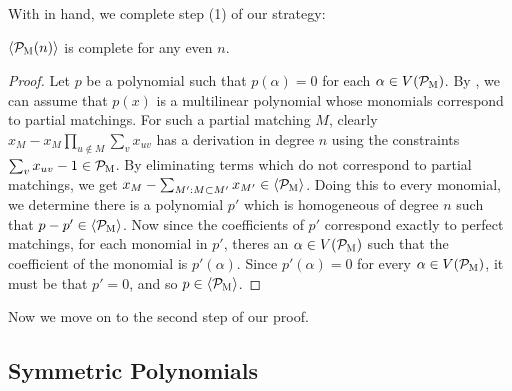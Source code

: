 With  in hand, we complete step (1) of our strategy:
\begin{lemma}\label{lem:matching-complete}
$\langle \mathcal P_{\textsc{M}}(n) \rangle$ is complete for any even $n$. 
\end{lemma}
\begin{proof}
Let $p$ be a polynomial such that $p(\alpha) = 0$ for each $\alpha \in V(\mathcal P_{\textsc{M}})$. By , we can assume that $p(x)$ is a multilinear polynomial whose monomials correspond to partial matchings. For such a partial matching $M$, clearly $x_M - x_M\prod_{u \notin M} \sum_v x_{uv}$ has a derivation in degree $n$ using the constraints $\sum_v x_{uv} - 1 \in \mathcal P_{\textsc{M}}$. By eliminating terms which do not correspond to partial matchings, we get $x_M - \sum_{M': M \subset M'} x_{M'} \in \langle \mathcal P_{\textsc{M}} \rangle$. Doing this to every monomial, we determine there is a polynomial $p'$ which is homogeneous of degree $n$ such that $p - p' \in \langle \mathcal P_{\textsc{M}} \rangle$. Now since the coefficients of $p'$ correspond exactly to perfect matchings, for each monomial in $p'$, theres an $\alpha \in V(\mathcal P_{\textsc{M}})$ such that the coefficient of the monomial is $p'(\alpha)$. Since $p'(\alpha) = 0$ for every $\alpha \in V(\mathcal P_{\textsc{M}})$, it must be that $p' = 0$, and so $p \in \langle \mathcal P_{\textsc{M}} \rangle$.
\end{proof}
Now we move on to the second step of our proof. 

\subsection{Symmetric Polynomials}

